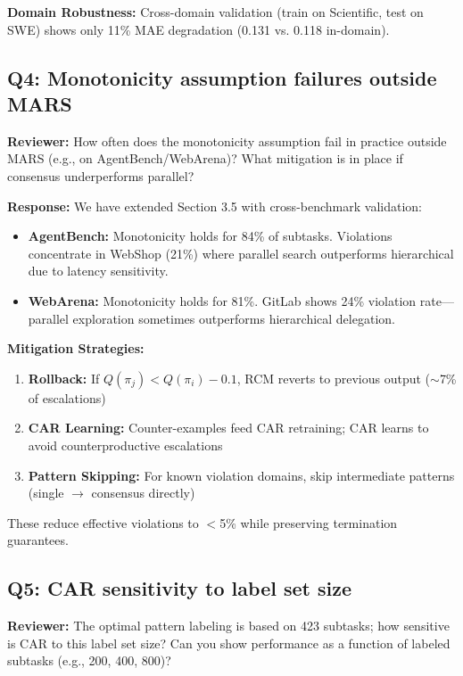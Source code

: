 \documentclass[11pt]{article}
\newcommand{\reviewer}[1]{\textcolor{reviewerblue}{\textbf{Reviewer:} #1}}
\newcommand{\response}[1]{\textcolor{responsegreen}{\textbf{Response:} #1}}
\begin{document}
\textbf{Domain Robustness:} Cross-domain validation (train on Scientific, test on SWE) shows only 11\% MAE degradation (0.131 vs. 0.118 in-domain).

\subsection*{Q4: Monotonicity assumption failures outside MARS}

\reviewer{How often does the monotonicity assumption fail in practice outside MARS (e.g., on AgentBench/WebArena)? What mitigation is in place if consensus underperforms parallel?}

\response{We have extended Section 3.5 with cross-benchmark validation:}

\begin{itemize}[leftmargin=*]
    \item \textbf{AgentBench:} Monotonicity holds for 84\% of subtasks. Violations concentrate in WebShop (21\%) where parallel search outperforms hierarchical due to latency sensitivity.
    \item \textbf{WebArena:} Monotonicity holds for 81\%. GitLab shows 24\% violation rate---parallel exploration sometimes outperforms hierarchical delegation.
\end{itemize}

\textbf{Mitigation Strategies:}
\begin{enumerate}[leftmargin=*,nosep]
    \item \textbf{Rollback:} If $Q(\pi_j) < Q(\pi_i) - 0.1$, RCM reverts to previous output ($\sim$7\% of escalations)
    \item \textbf{CAR Learning:} Counter-examples feed CAR retraining; CAR learns to avoid counterproductive escalations
    \item \textbf{Pattern Skipping:} For known violation domains, skip intermediate patterns (single $\rightarrow$ consensus directly)
\end{enumerate}

These reduce effective violations to $<$5\% while preserving termination guarantees.

\subsection*{Q5: CAR sensitivity to label set size}

\reviewer{The optimal pattern labeling is based on 423 subtasks; how sensitive is CAR to this label set size? Can you show performance as a function of labeled subtasks (e.g., 200, 400, 800)?}
\end{document}
